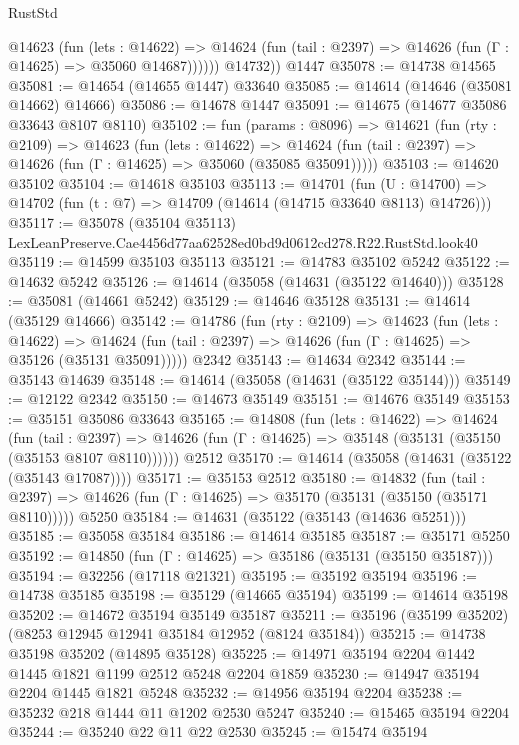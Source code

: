 \begin{lexlean}{RustStd}
\begin{coremodule}
            @14623
              (fun (lets : @14622) =>
              @14624 (fun (tail : @2397) => @14626 (fun (Γ : @14625) => @35060 @14687))))))
        @14732))
    @1447
@35078 := @14738 @14565
@35081 := @14654 (@14655 @1447) @33640
@35085 := @14614 (@14646 (@35081 @14662) @14666)
@35086 := @14678 @1447
@35091 := @14675 (@14677 @35086 @33643 @8107 @8110)
@35102 := fun (params : @8096) =>
  @14621
    (fun (rty : @2109) =>
    @14623
      (fun (lets : @14622) =>
      @14624 (fun (tail : @2397) => @14626 (fun (Γ : @14625) => @35060 (@35085 @35091)))))
@35103 := @14620 @35102
@35104 := @14618 @35103
@35113 := @14701
    (fun (U : @14700) => @14702 (fun (t : @7) => @14709 (@14614 (@14715 @33640 @8113) @14726)))
@35117 := @35078
    (@35104 @35113)
    LexLeanPreserve.Cae4456d77aa62528ed0bd9d0612cd278.R22.RustStd.look40
@35119 := @14599 @35103 @35113
@35121 := @14783 @35102 @5242
@35122 := @14632 @5242
@35126 := @14614 (@35058 (@14631 (@35122 @14640)))
@35128 := @35081 (@14661 @5242)
@35129 := @14646 @35128
@35131 := @14614 (@35129 @14666)
@35142 := @14786
    (fun (rty : @2109) =>
    @14623
      (fun (lets : @14622) =>
      @14624 (fun (tail : @2397) => @14626 (fun (Γ : @14625) => @35126 (@35131 @35091)))))
    @2342
@35143 := @14634 @2342
@35144 := @35143 @14639
@35148 := @14614 (@35058 (@14631 (@35122 @35144)))
@35149 := @12122 @2342
@35150 := @14673 @35149
@35151 := @14676 @35149
@35153 := @35151 @35086 @33643
@35165 := @14808
    (fun (lets : @14622) =>
    @14624
      (fun (tail : @2397) =>
      @14626 (fun (Γ : @14625) => @35148 (@35131 (@35150 (@35153 @8107 @8110))))))
    @2512
@35170 := @14614 (@35058 (@14631 (@35122 (@35143 @17087))))
@35171 := @35153 @2512
@35180 := @14832
    (fun (tail : @2397) => @14626 (fun (Γ : @14625) => @35170 (@35131 (@35150 (@35171 @8110)))))
    @5250
@35184 := @14631 (@35122 (@35143 (@14636 @5251)))
@35185 := @35058 @35184
@35186 := @14614 @35185
@35187 := @35171 @5250
@35192 := @14850 (fun (Γ : @14625) => @35186 (@35131 (@35150 @35187)))
@35194 := @32256 (@17118 @21321)
@35195 := @35192 @35194
@35196 := @14738 @35185
@35198 := @35129 (@14665 @35194)
@35199 := @14614 @35198
@35202 := @14672 @35194 @35149 @35187
@35211 := @35196 (@35199 @35202) (@8253 @12945 @12941 @35184 @12952 (@8124 @35184))
@35215 := @14738 @35198 @35202 (@14895 @35128)
@35225 := @14971 @35194 @2204 @1442 @1445 @1821 @1199 @2512 @5248 @2204 @1859
@35230 := @14947 @35194 @2204 @1445 @1821 @5248
@35232 := @14956 @35194 @2204
@35238 := @35232 @218 @1444 @11 @1202 @2530 @5247
@35240 := @15465 @35194 @2204
@35244 := @35240 @22 @11 @22 @2530
@35245 := @15474 @35194

\end{coremodule}
\end{lexlean}
